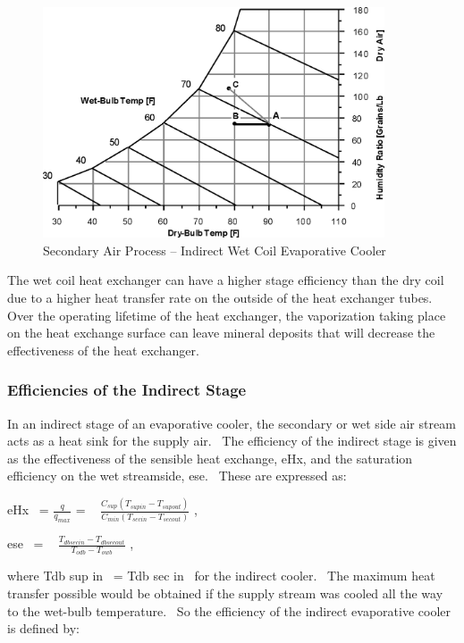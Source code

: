 \begin{figure}[hbtp] %
\centering
\includegraphics[width=0.9\textwidth, height=0.9\textheight, keepaspectratio=true]{media/image4798.png}
\caption{Secondary Air Process – Indirect Wet Coil Evaporative Cooler \protect \label{fig:secondary-air-process-indirect-wet-coil}}
\end{figure}

The wet coil heat exchanger can have a higher stage efficiency than the dry coil due to a higher heat transfer rate on the outside of the heat exchanger tubes.~ Over the operating lifetime of the heat exchanger, the vaporization taking place on the heat exchange surface can leave mineral deposits that will decrease the effectiveness of the heat exchanger.

\subsubsection{Efficiencies of the Indirect Stage}\label{efficiencies-of-the-indirect-stage}

In an indirect stage of an evaporative cooler, the secondary or wet side air stream acts as a heat sink for the supply air.~ The efficiency of the indirect stage is given as the effectiveness of the sensible heat exchange, eHx, and the saturation efficiency on the wet streamside, ese.~ These are expressed as:

eHx~ = \(\frac{q}{{{q_{max}}}}\) = ~ \(\frac{{{C_{sup}}({T_{supin}} - {T_{supout}})}}{{{C_{min}}({T_{secin}} - {T_{secout}})}}\) ,

ese~ = ~ \(\frac{{{T_{dbsecin}} - {T_{dbsecout}}}}{{{T_{odb}} - {T_{owb}}}}\) ,

where Tdb sup in~ = Tdb sec in~ for the indirect cooler.~ The maximum heat transfer possible would be obtained if the supply stream was cooled all the way to the wet-bulb temperature.~ So the efficiency of the indirect evaporative cooler is defined by:

